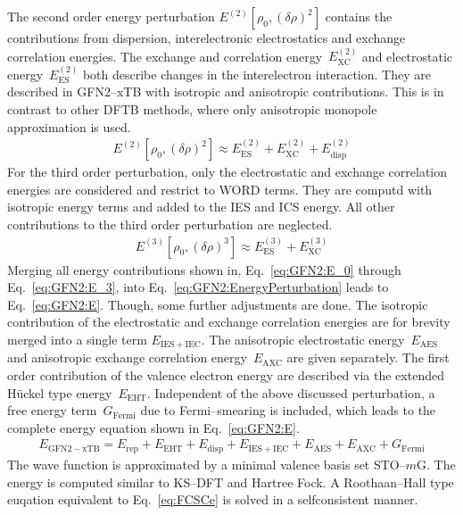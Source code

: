 The second order energy perturbation $E^{(2)}[\rho_0,(\delta \rho)^2]$ contains the contributions from dispersion,
interelectronic electrostatics and exchange correlation energies.
The exchange and correlation energy~$E_\mathrm{XC}^{(2)}$
and electrostatic energy~$E_\mathrm{ES}^{(2)}$ both describe changes in the interelectron interaction. They are described in \mbox{GFN2--xTB} with isotropic and anisotropic contributions.
This is in contrast to other DFTB methods, where only anisotropic monopole approximation is used.
	\begin{align}
        \label{eq:GFN2:E_2}
		E^{(2)}[\rho_0,(\delta \rho)^2] \approx E_\mathrm{ES}^{(2)} + E_\mathrm{XC}^{(2)} + E_\mathrm{disp}^{(2)}
    \end{align}	
	For the third order perturbation, 
	only the electrostatic and exchange correlation energies are considered and restrict to WORD terms.
	They are computd with isotropic energy terms and added to the IES and ICS energy.
	All other contributions to the third order perturbation are neglected.
	\begin{align}
        \label{eq:GFN2:E_3}
		E^{(3)}[\rho_0,(\delta \rho)^3] \approx  E_\mathrm{ES}^{(3)} + E_\mathrm{XC}^{(3)} 
    \end{align}	
Merging all energy contributions shown in, Eq.~\eqref{eq:GFN2:E_0} through Eq.~\eqref{eq:GFN2:E_3}, into Eq.~\eqref{eq:GFN2:EnergyPerturbation} leads to Eq.~\eqref{eq:GFN2:E}.
Though, some further adjustments are done. The isotropic contribution of the electrostatic and exchange correlation energies are for brevity merged into a single term $E_\mathrm{IES+IEC}$.
The anisotropic electrostatic energy~$E_\mathrm{AES}$ and anisotropic exchange correlation energy~$E_\mathrm{AXC}$ are given separately.
The first order contribution of the valence electron energy are described via the extended Hückel type energy~$E_\mathrm{EHT}$.
Independent of the above discussed perturbation, a free energy term~$G_\mathrm{Fermi}$ due to Fermi--smearing  is included,
which leads to the complete energy equation shown in Eq.~\eqref{eq:GFN2:E}.
	\begin{align}
		\label{eq:GFN2:E}
		E_\mathrm{GFN2-xTB} =  E_\mathrm{rep} + E_\mathrm{EHT} + E_\mathrm{disp} 
		+ E_\mathrm{IES+IEC} + E_\mathrm{AES} + E_\mathrm{AXC} + G_\mathrm{Fermi}
	\end{align}
	The wave function is approximated by a minimal valence basis set STO--$m$G.
	The energy is computed similar to KS--DFT and Hartree Fock.
	A Roothaan--Hall type euqation equivalent to Eq.~\eqref{eq:FCSCe} is solved in a selfconsistent manner.

